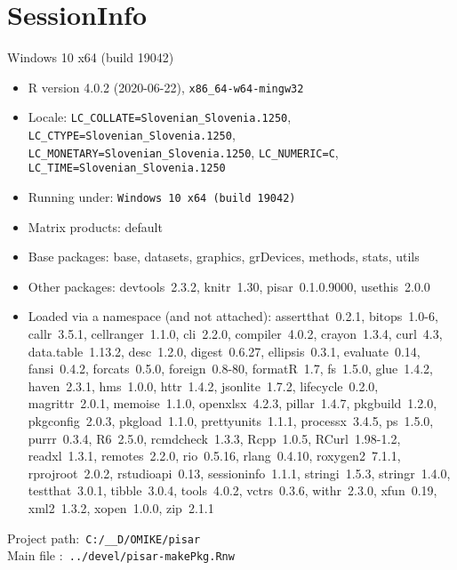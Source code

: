 \documentclass[a4paper,12pt]{article}\usepackage[]{graphicx}\usepackage[]{color}
\begin{document}
%
%

%

\clearpage
\section*{SessionInfo}
{\small
Windows 10 x64 (build 19042) 
\begin{itemize}\raggedright
  \item R version 4.0.2 (2020-06-22), \verb|x86_64-w64-mingw32|
  \item Locale: \verb|LC_COLLATE=Slovenian_Slovenia.1250|, \verb|LC_CTYPE=Slovenian_Slovenia.1250|, \verb|LC_MONETARY=Slovenian_Slovenia.1250|, \verb|LC_NUMERIC=C|, \verb|LC_TIME=Slovenian_Slovenia.1250|
  \item Running under: \verb|Windows 10 x64 (build 19042)|
  \item Matrix products: default
  \item Base packages: base, datasets, graphics, grDevices,
    methods, stats, utils
  \item Other packages: devtools~2.3.2, knitr~1.30,
    pisar~0.1.0.9000, usethis~2.0.0
  \item Loaded via a namespace (and not attached):
    assertthat~0.2.1, bitops~1.0-6, callr~3.5.1,
    cellranger~1.1.0, cli~2.2.0, compiler~4.0.2, crayon~1.3.4,
    curl~4.3, data.table~1.13.2, desc~1.2.0, digest~0.6.27,
    ellipsis~0.3.1, evaluate~0.14, fansi~0.4.2, forcats~0.5.0,
    foreign~0.8-80, formatR~1.7, fs~1.5.0, glue~1.4.2,
    haven~2.3.1, hms~1.0.0, httr~1.4.2, jsonlite~1.7.2,
    lifecycle~0.2.0, magrittr~2.0.1, memoise~1.1.0,
    openxlsx~4.2.3, pillar~1.4.7, pkgbuild~1.2.0,
    pkgconfig~2.0.3, pkgload~1.1.0, prettyunits~1.1.1,
    processx~3.4.5, ps~1.5.0, purrr~0.3.4, R6~2.5.0,
    rcmdcheck~1.3.3, Rcpp~1.0.5, RCurl~1.98-1.2, readxl~1.3.1,
    remotes~2.2.0, rio~0.5.16, rlang~0.4.10, roxygen2~7.1.1,
    rprojroot~2.0.2, rstudioapi~0.13, sessioninfo~1.1.1,
    stringi~1.5.3, stringr~1.4.0, testthat~3.0.1,
    tibble~3.0.4, tools~4.0.2, vctrs~0.3.6, withr~2.3.0,
    xfun~0.19, xml2~1.3.2, xopen~1.0.0, zip~2.1.1
\end{itemize}
Project path:\verb' C:/__D/OMIKE/pisar '\\
Main file :\verb' ../devel/pisar-makePkg.Rnw '


}
\end{document}
